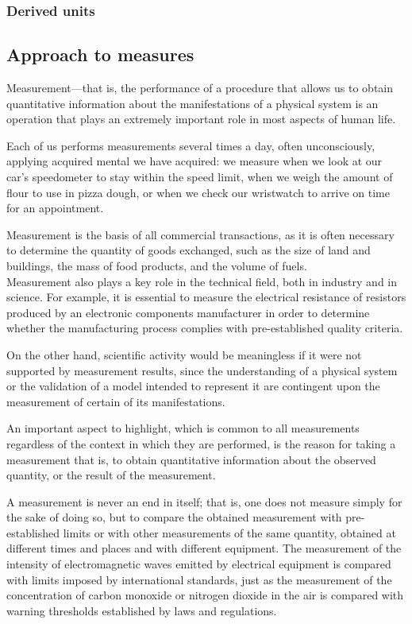 \documentclass[../main.tex]{subfiles}
\begin{document}
\subsubsection{Derived units}




\subsection{Approach to measures}

Measurement—that is, the performance of a procedure that allows us to obtain quantitative information about the manifestations of a physical system is an operation that plays an extremely important role in most aspects of human life. 

Each of us performs measurements several times a day, often unconsciously, applying acquired mental we have acquired: we measure when we look at our car’s speedometer to stay within the speed limit, when we weigh the amount of flour to use in pizza dough, or when we check our wristwatch to arrive on time for an appointment.

Measurement is the basis of all commercial transactions, as it is often necessary to determine the quantity of goods exchanged, such as the size of land and buildings, the mass of food products, and the volume of fuels.\\

Measurement also plays a key role in the technical field, both in industry and in science. For example, it is essential to measure the electrical resistance of resistors produced by an electronic components manufacturer in order to determine whether the manufacturing process complies with pre-established quality criteria. 

On the other hand, scientific activity would be meaningless if it were not supported by measurement results, since the understanding of a physical system or the validation of a model intended to represent it are contingent upon the measurement of certain of its manifestations.

An important aspect to highlight, which is common to all measurements regardless of the context in which they are performed, is the reason for taking a measurement that is, to obtain quantitative information about the observed quantity, or the result of the measurement. 

A measurement is never an end in itself; that is, one does not measure simply for the sake of doing so, but to compare the obtained measurement with pre-established limits or with other measurements of the same quantity, obtained at different times and places and with different equipment. The measurement of the intensity of electromagnetic waves emitted by electrical equipment is compared with limits imposed by international standards, just as the measurement of the concentration of carbon monoxide or nitrogen dioxide in the air is compared with warning thresholds established by laws and regulations. 
\end{document}
